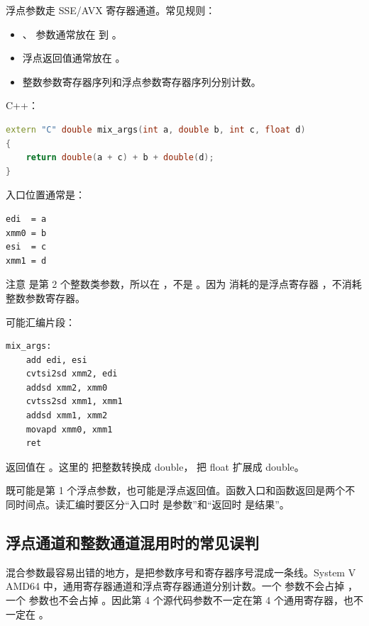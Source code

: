 浮点参数走 SSE/AVX 寄存器通道。常见规则：

\begin{itemize}
  \item {}、 参数通常放在  到 。
  \item 浮点返回值通常放在 。
  \item 整数参数寄存器序列和浮点参数寄存器序列分别计数。
\end{itemize}

C++：

\begin{lstlisting}[language=C++]
extern "C" double mix_args(int a, double b, int c, float d)
{
    return double(a + c) + b + double(d);
}
\end{lstlisting}

入口位置通常是：

\begin{lstlisting}
edi  = a
xmm0 = b
esi  = c
xmm1 = d
\end{lstlisting}

注意  是第 2 个整数类参数，所以在 ，不是 。因为  消耗的是浮点寄存器 ，不消耗整数参数寄存器。

可能汇编片段：

\begin{lstlisting}
mix_args:
    add edi, esi
    cvtsi2sd xmm2, edi
    addsd xmm2, xmm0
    cvtss2sd xmm1, xmm1
    addsd xmm1, xmm2
    movapd xmm0, xmm1
    ret
\end{lstlisting}

返回值在 。这里的  把整数转换成 double， 把 float 扩展成 double。

\begin{warningbox}
 既可能是第 1 个浮点参数，也可能是浮点返回值。函数入口和函数返回是两个不同时间点。读汇编时要区分“入口时  是参数”和“返回时  是结果”。
\end{warningbox}

\subsection{浮点通道和整数通道混用时的常见误判}

混合参数最容易出错的地方，是把参数序号和寄存器序号混成一条线。System V AMD64 中，通用寄存器通道和浮点寄存器通道分别计数。一个  参数不会占掉 ，一个  参数也不会占掉 。因此第 4 个源代码参数不一定在第 4 个通用寄存器，也不一定在 。

